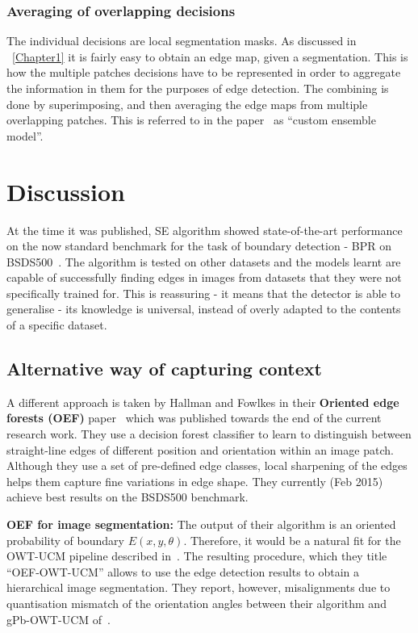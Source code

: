 \subsubsection*{Averaging of overlapping decisions}
The individual decisions are local segmentation masks. As discussed in \textsection~\ref{Chapter1} it is fairly easy to obtain an edge map, given a segmentation. This is how the multiple patches decisions have to be represented in order to aggregate the information in them for the purposes of edge detection. The combining is done by superimposing, %
and then averaging the edge maps from multiple overlapping patches. %
This is referred to in the paper~\cite{DollarICCV13edges} as ``custom ensemble model''.

\section{Discussion}
At the time it was published, SE algorithm showed state-of-the-art performance on the now standard benchmark for the task of boundary detection - BPR on BSDS500~\cite{Arbelaez11}. The algorithm is tested on other datasets and the models learnt are capable of successfully finding edges in images from datasets that they were not specifically trained for. This is reassuring - it means that the detector is able to generalise - its knowledge is universal, instead of overly adapted to %
the contents of a specific dataset.

\subsection*{Alternative way of capturing context}
A different approach is taken by Hallman and Fowlkes in their \textbf{Oriented edge forests (OEF)} paper~\cite{Hallman2014} which was published towards the end of the current research work. They use a decision forest classifier to learn to distinguish between straight-line edges of different position and orientation within an image patch. Although they use a set of pre-defined edge classes, local sharpening of the edges helps them capture fine variations in edge shape. They currently (Feb 2015) achieve best results on the BSDS500 benchmark.

\textbf{OEF for image segmentation:} The output of their algorithm is an oriented probability of boundary $E(x,y,\theta)$. Therefore, it would be a natural fit for the OWT-UCM pipeline described in~\cite{Arbelaez11}. The resulting procedure, which they title ``OEF-OWT-UCM'' allows to use the edge detection results to obtain a hierarchical image segmentation. They report, however, misalignments due to quantisation mismatch of the orientation angles between their algorithm and gPb-OWT-UCM of~\cite{Arbelaez11}.

